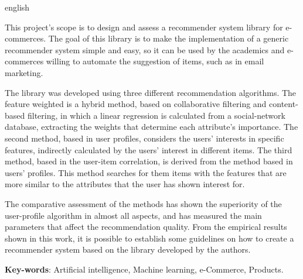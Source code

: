 \setlength{\absparsep}{18pt} %
\begin{resumo}[Abstract]
 \begin{otherlanguage*}{english}

This project's scope is to design and assess a recommender system library for e-commerces. The goal of this library is to make the implementation of a generic recommender system simple and easy, so it can be used by the academics and e-commerces willing to automate the suggestion of items, such as in email marketing.

The library was developed using three different recommendation algorithms. The feature weighted is a hybrid method, based on collaborative filtering and content-based filtering, in which a linear regression is calculated from a social-network database, extracting the weights that determine each attribute's importance. The second method, based in user profiles, considers the users' interests in specific features, indirectly calculated by the users' interest in different items. The third method, based in the user-item correlation, is derived from the method based in users' profiles. This method searches for them items with the features that are more similar to the attributes that the user has shown interest for.

The comparative assessment of the methods has shown the superiority of the user-profile algorithm in almost all aspects, and has measured the main parameters that affect the recommendation quality. From the empirical results shown in this work, it is possible to establish some guidelines on how to create a recommender system based on the library developed by the authors.

   \vspace{\onelineskip}
 
   \noindent 
   \textbf{Key-words}: Artificial intelligence, Machine learning, e-Commerce, Products.
 \end{otherlanguage*}
\end{resumo}
